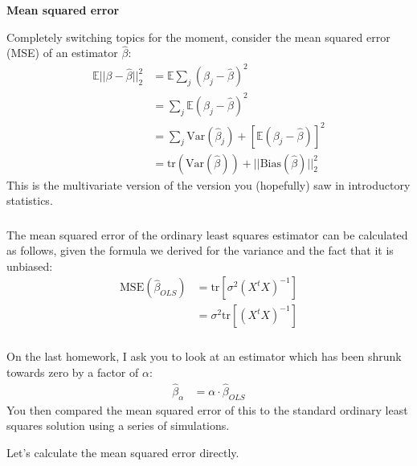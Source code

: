 \begin{frame}[fragile] \frametitle{}

\textbf{Mean squared error}

Completely switching topics for the moment, consider the mean
squared error (MSE) of an estimator $\widehat{\beta}$:\pause
\begin{align*}
\mathbb{E} || \beta - \widehat{\beta} ||_2^2
&= \mathbb{E} \sum_j (\beta_j - \widehat{\beta})^2\\
&= \sum_j \mathbb{E} (\beta_j - \widehat{\beta})^2\\
&= \sum_j \text{Var} (\widehat{\beta}_j) + \left[\mathbb{E} (\beta_j - \widehat{\beta}) \right]^2\\
&= \text{tr} (\text{Var}(\widehat{\beta})) + ||\text{Bias}(\widehat{\beta}) ||_2^2
\end{align*}
\pause This is the multivariate version of the version you (hopefully) saw in
introductory statistics.

\end{frame}

\begin{frame}[fragile] \frametitle{}

The mean squared error of the ordinary least squares estimator can be
calculated as follows, given the formula we derived for the variance
and the fact that it is unbiased:
\begin{align*}
\text{MSE} (\widehat{\beta}_{OLS})
  &= \text{tr} \left[ \sigma^2 (X^t X)^{-1} \right] \\
  &= \sigma^2 \text{tr} \left[(X^t X)^{-1} \right]
\end{align*}

\end{frame}

\begin{frame}[fragile] \frametitle{}

On the last homework, I ask you to look at an estimator which
has been shrunk towards zero by a factor of $\alpha$:
\begin{align*}
\mathbb{\widehat{\beta}}_\alpha &= \alpha \cdot \widehat{\beta}_{OLS}
\end{align*}
You then compared the mean squared error of this to the standard
ordinary least squares solution using a series of simulations.

\pause Let's calculate the mean squared error directly.

\end{frame}


